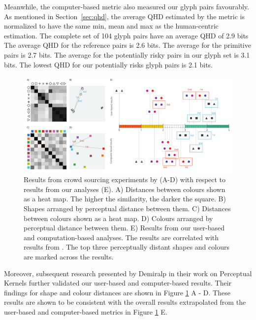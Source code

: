Meanwhile, the computer-based metric also measured our glyph pairs favourably.
As mentioned in Section~\ref{sec:qhd}, the average QHD estimated by the metric is normalized to have the same min, mean and max as the human-centric estimation.
The complete set of 104 glyph pairs have an average QHD of 2.9 bits
The average QHD for the reference pairs is 2.6 bits.
The average for the primitive pairs is 2.7 bits.
The average for the potentially risky pairs in our glyph set is 3.1 bits.
The lowest QHD for our potentially risks glyph pairs is 2.1 bits.

\begin{figure}[t!]
\begin{center}
\includegraphics[width=\textwidth]{images/filesystem/perceptual_kernal_validation}
\end{center}
\caption{Results from crowd sourcing experiments by \cite{demiralplearning} (A-D) with respect to results from our analyses (E).
A) Distances between colours shown as a heat map.
The higher the similarity, the darker the square.
B) Shapes arranged by perceptual distance between them.
C) Distances between colours shown as a heat map.
D) Colours arranged by perceptual distance between them.
E) Results from our user-based and computation-based analyses.
The results are correlated with results from \cite{demiralplearning}.
The top three perceptually distant shapes and colours are marked across the results.}
\label{fig:perceptual_kernel}
\end{figure}

Moreover, subsequent research presented by Demiralp \etal in their work on Perceptual Kernels\cite{demiralplearning} further validated our user-based and computer-based results.
Their findings for shape and colour distances are shown in Figure \ref{fig:perceptual_kernel} A - D.
These results are shown to be consistent with the overall results extrapolated from the user-based and computer-based metrics in Figure \ref{fig:perceptual_kernel} E. 

